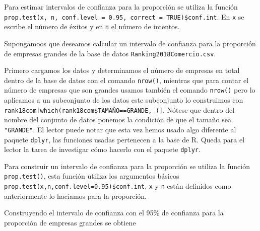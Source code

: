 \documentclass[letterpaper,]{book}
\newenvironment{Shaded}{\begin{snugshade}}{\end{snugshade}}
\newcommand{\DataTypeTok}[1]{\textcolor[rgb]{0.13,0.29,0.53}{#1}}
\newcommand{\KeywordTok}[1]{\textcolor[rgb]{0.13,0.29,0.53}{\textbf{#1}}}
\newcommand{\NormalTok}[1]{#1}
\newcommand{\OperatorTok}[1]{\textcolor[rgb]{0.81,0.36,0.00}{\textbf{#1}}}
\newcommand{\OtherTok}[1]{\textcolor[rgb]{0.56,0.35,0.01}{#1}}
\newcommand{\StringTok}[1]{\textcolor[rgb]{0.31,0.60,0.02}{#1}}
\begin{document}
Para estimar intervalos de confianza para la proporción se utiliza la función \texttt{prop.test(x,\ n,\ conf.level\ =\ 0.95,\ correct\ =\ TRUE)\$conf.int}. En \texttt{x} se escribe el número de éxitos y en \texttt{n} el número de intentos.

Supongamoos que deseamos calcular un intervalo de confianza para la proporción de empresas grandes de la base de datos \texttt{Ranking2018Comercio.csv}.

Primero cargamos los datos y determinamos el número de empresas en total dentro de la base de datos con el comando \texttt{nrow()}, mientras que para contar el número de empresas que son grandes usamos también el comando \texttt{nrow()} pero lo aplicamos a un subconjunto de los datos este subconjunto lo construimos con \texttt{rank18com{[}which(rank18com\$TAMAÑO==\textquotesingle{}GRANDE\textquotesingle{},\ ){]}}. Nótese que dentro del nombre del conjunto de datos ponemos la condición de que el tamaño sea \texttt{"GRANDE"}. El lector puede notar que esta vez hemos usado algo diferente al paquete \texttt{dplyr}, las funciones usadas pertenecen a la base de R. Queda para el lector la tarea de investigar cómo hacerlo con el paquete \texttt{dplyr}.

\begin{Shaded}
\end{Shaded}

Para construir un intervalo de confianza para la proporción se utiliza la función \texttt{prop.test()}, esta función utiliza los argumentos básicos \texttt{prop.test(x,n,conf.level=0.95)\$conf.int}, \texttt{x} y \texttt{n} están definidos como anteriormente lo hacíamos para la proporción.

Construyendo el intervalo de confianza con el 95\% de confianza para la proporción de empresas grandes se obtiene
\end{document}
